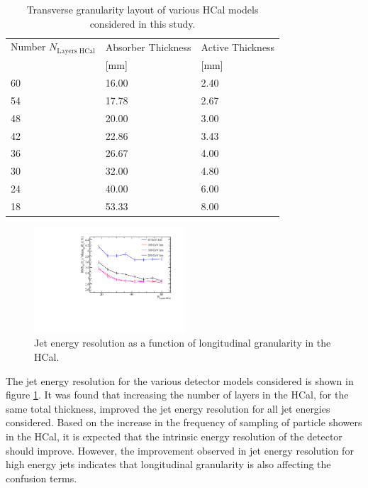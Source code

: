  \begin{table}[h!]
\centering
\begin{tabular}{ l l l }
\hline
Number $N_{\text{Layers HCal}}$& Absorber Thickness & Active Thickness \\
 & [mm] & [mm] \\
\hline
60 & 16.00 & 2.40 \\ 
54 & 17.78 & 2.67 \\
48 & 20.00 & 3.00 \\
42 & 22.86 & 3.43 \\
36 & 26.67 & 4.00 \\
30 & 32.00 & 4.80 \\
24 & 40.00 & 6.00 \\
18 & 53.33 & 8.00 \\
\hline
\end{tabular}
\caption[Transverse granularity layout of various HCal models considered in this study.]{Transverse granularity layout of various HCal models considered in this study.}
\label{table:nlayershcaloption}
\end{table}

\begin{figure}
\centering
\includegraphics[width=0.5\textwidth]{OptimisationStudies/Plots/JetEnergyResolutions/JER_vs_NumberOfLayersInTheHCal.pdf}
\caption[Jet energy resolution as a function of longitudinal granularity in the HCal.]{Jet energy resolution as a function of longitudinal granularity in the HCal.}
\label{fig:hcalnlayers}
\end{figure}

The jet energy resolution for the various detector models considered is shown in figure \ref{fig:hcalnlayers}.  It was found that increasing the number of layers in the HCal, for the same total thickness, improved the jet energy resolution for all jet energies considered.  Based on the increase in the frequency of sampling of particle showers in the HCal, it is expected that the intrinsic energy resolution of the detector should improve.  However, the improvement observed in jet energy resolution for high energy jets indicates that longitudinal granularity is also affecting the confusion terms.

